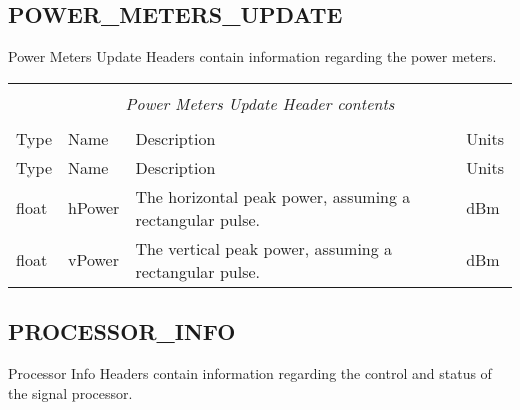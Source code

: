 \documentclass[10pt]{article}
\newcommand{\tblspc}{\rule{0pt}{3ex}}
\begin{document}
\subsection{POWER\_METERS\_UPDATE}
\label{sec:power_meters_update}
Power Meters Update Headers contain information regarding the power meters.

\begin{longtable}{|p{}|l|p{}|p{}|}
\hline
\multicolumn{4}{|c|}{} \\
\multicolumn{4}{|c|}{\emph{Power Meters Update Header contents}} \\
\multicolumn{4}{|c|}{} \\
\hline Type & Name & Description & Units \\ \hline \endfirsthead
\hline Type & Name & Description & Units \\ \hline \endhead
\hline \endfoot
\tblspc float & hPower & The horizontal peak power, assuming a rectangular pulse. & dBm \\
\hline
\tblspc float & vPower & The vertical peak power, assuming a rectangular pulse. & dBm \\
\hline
\end{longtable}

\subsection{PROCESSOR\_INFO}
\label{sec:processor_info}
Processor Info Headers contain information regarding the control and status of the signal processor.
\end{document}
